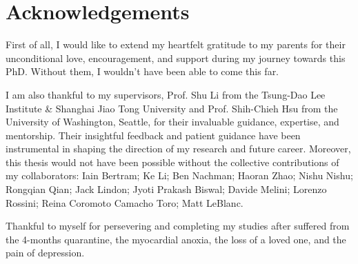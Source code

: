 \documentclass[UTF8,12pt]{ctexart}
\numberwithin{equation}{section}
\renewcommand {\thefigure} {\thesection{}.\arabic{figure}}%
\renewcommand {\thetable} {\thesection{}.\arabic{table}}
\begin{document}
\newpage
{}
\renewcommand\refname{REFERENCES}



\printbibliography






%
%
%
%
%
%


\newpage
{}
\section{Acknowledgements}

First of all, I would like to extend my heartfelt gratitude to my parents for their unconditional love, encouragement, and support during my journey towards this PhD. Without them, I wouldn't have been able to come this far. 

I am also thankful to my supervisors, Prof. Shu Li from the Tsung-Dao Lee Institute \& Shanghai Jiao Tong University and Prof. Shih-Chieh Hsu from the University of Washington, Seattle, for their invaluable guidance, expertise, and mentorship. Their insightful feedback and patient guidance have been instrumental in shaping the direction of my research and future career. Moreover, this thesis would not have been possible without the collective contributions of my collaborators: Iain Bertram; Ke Li; Ben Nachman; Haoran Zhao; Nishu Nishu; Rongqian Qian; Jack Lindon;  Jyoti Prakash Biswal; Davide Melini; Lorenzo Rossini; Reina Coromoto Camacho Toro; Matt LeBlanc.

Thankful to myself for persevering and completing my studies after suffered from the 4-months quarantine, the myocardial anoxia, the loss of a loved one, and the pain of depression.

\end{document}
